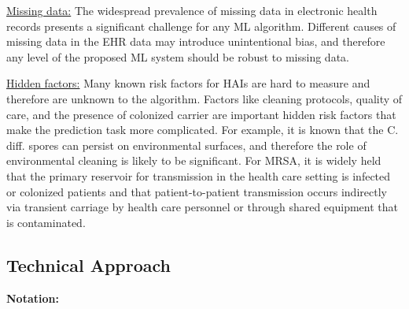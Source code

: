 \underline{Missing data:}  The widespread prevalence of missing data in electronic health records presents a significant challenge for any ML algorithm. Different causes of missing data in the EHR data may introduce unintentional bias, and therefore any level of the proposed ML system should be robust to missing data.

\underline{Hidden factors:} Many known risk factors for HAIs are hard to measure and therefore are unknown to the algorithm. Factors like cleaning protocols, quality of care, and the presence of colonized carrier are important hidden risk factors that make the prediction task more complicated.  For example, it is known that the C. diff. spores can persist on environmental surfaces, and therefore the role of environmental cleaning is likely to be significant. For MRSA, it is widely held that the primary reservoir for transmission in the health care setting is infected or colonized patients and that patient-to-patient transmission occurs indirectly via transient carriage by health care personnel or through shared equipment that is contaminated.





\subsection{Technical Approach}
{\bf Notation:} 








